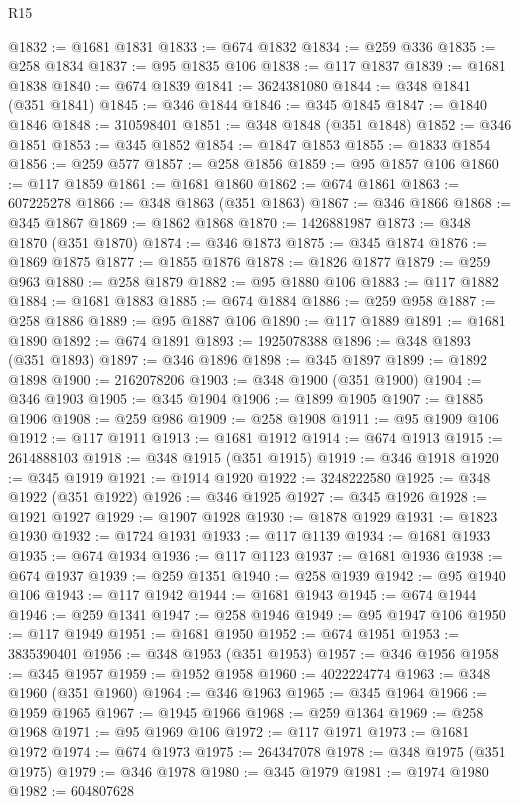 \begin{lexlean}{R15}
\begin{coremodule}
{{{{{{{{{{{{{{{{{{{{{{{{{{{{{{{{{{{{{{{{{{{{{{{{{{{{{{{{{{{{{{{{{{{{{{@1832 := @1681 @1831
@1833 := @674 @1832
@1834 := @259 @336
@1835 := @258 @1834
@1837 := @95 @1835 @106
@1838 := @117 @1837
@1839 := @1681 @1838
@1840 := @674 @1839
@1841 := 3624381080
@1844 := @348 @1841 (@351 @1841)
@1845 := @346 @1844
@1846 := @345 @1845
@1847 := @1840 @1846
@1848 := 310598401
@1851 := @348 @1848 (@351 @1848)
@1852 := @346 @1851
@1853 := @345 @1852
@1854 := @1847 @1853
@1855 := @1833 @1854
@1856 := @259 @577
@1857 := @258 @1856
@1859 := @95 @1857 @106
@1860 := @117 @1859
@1861 := @1681 @1860
@1862 := @674 @1861
@1863 := 607225278
@1866 := @348 @1863 (@351 @1863)
@1867 := @346 @1866
@1868 := @345 @1867
@1869 := @1862 @1868
@1870 := 1426881987
@1873 := @348 @1870 (@351 @1870)
@1874 := @346 @1873
@1875 := @345 @1874
@1876 := @1869 @1875
@1877 := @1855 @1876
@1878 := @1826 @1877
@1879 := @259 @963
@1880 := @258 @1879
@1882 := @95 @1880 @106
@1883 := @117 @1882
@1884 := @1681 @1883
@1885 := @674 @1884
@1886 := @259 @958
@1887 := @258 @1886
@1889 := @95 @1887 @106
@1890 := @117 @1889
@1891 := @1681 @1890
@1892 := @674 @1891
@1893 := 1925078388
@1896 := @348 @1893 (@351 @1893)
@1897 := @346 @1896
@1898 := @345 @1897
@1899 := @1892 @1898
@1900 := 2162078206
@1903 := @348 @1900 (@351 @1900)
@1904 := @346 @1903
@1905 := @345 @1904
@1906 := @1899 @1905
@1907 := @1885 @1906
@1908 := @259 @986
@1909 := @258 @1908
@1911 := @95 @1909 @106
@1912 := @117 @1911
@1913 := @1681 @1912
@1914 := @674 @1913
@1915 := 2614888103
@1918 := @348 @1915 (@351 @1915)
@1919 := @346 @1918
@1920 := @345 @1919
@1921 := @1914 @1920
@1922 := 3248222580
@1925 := @348 @1922 (@351 @1922)
@1926 := @346 @1925
@1927 := @345 @1926
@1928 := @1921 @1927
@1929 := @1907 @1928
@1930 := @1878 @1929
@1931 := @1823 @1930
@1932 := @1724 @1931
@1933 := @117 @1139
@1934 := @1681 @1933
@1935 := @674 @1934
@1936 := @117 @1123
@1937 := @1681 @1936
@1938 := @674 @1937
@1939 := @259 @1351
@1940 := @258 @1939
@1942 := @95 @1940 @106
@1943 := @117 @1942
@1944 := @1681 @1943
@1945 := @674 @1944
@1946 := @259 @1341
@1947 := @258 @1946
@1949 := @95 @1947 @106
@1950 := @117 @1949
@1951 := @1681 @1950
@1952 := @674 @1951
@1953 := 3835390401
@1956 := @348 @1953 (@351 @1953)
@1957 := @346 @1956
@1958 := @345 @1957
@1959 := @1952 @1958
@1960 := 4022224774
@1963 := @348 @1960 (@351 @1960)
@1964 := @346 @1963
@1965 := @345 @1964
@1966 := @1959 @1965
@1967 := @1945 @1966
@1968 := @259 @1364
@1969 := @258 @1968
@1971 := @95 @1969 @106
@1972 := @117 @1971
@1973 := @1681 @1972
@1974 := @674 @1973
@1975 := 264347078
@1978 := @348 @1975 (@351 @1975)
@1979 := @346 @1978
@1980 := @345 @1979
@1981 := @1974 @1980
@1982 := 604807628
}}}}}}}}}}}}}}}}}}}}}}}}}}}}}}}}}}}}}}}}}}}}}}}}}}}}}}}}}}}}}}}}}}}}}}
\end{coremodule}
\end{lexlean}
